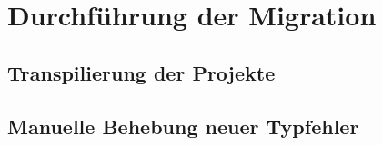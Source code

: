 \chapter{Durchführung der Migration}

\section{Transpilierung der Projekte}
\section{Manuelle Behebung neuer Typfehler}
